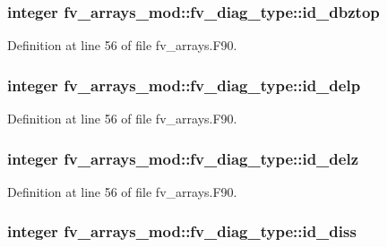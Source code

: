 \subsubsection[{id\-\_\-dbztop}]{\setlength{\rightskip}{0pt plus 5cm}integer fv\-\_\-arrays\-\_\-mod\-::fv\-\_\-diag\-\_\-type\-::id\-\_\-dbztop}\label{structfv__arrays__mod_1_1fv__diag__type_a811e1fc8c66d2fde773fae4b756a5292}


Definition at line 56 of file fv\-\_\-arrays.\-F90.

\subsubsection[{id\-\_\-delp}]{\setlength{\rightskip}{0pt plus 5cm}integer fv\-\_\-arrays\-\_\-mod\-::fv\-\_\-diag\-\_\-type\-::id\-\_\-delp}\label{structfv__arrays__mod_1_1fv__diag__type_a224242f8495b284ff480eab3d9b2bed7}


Definition at line 56 of file fv\-\_\-arrays.\-F90.

\subsubsection[{id\-\_\-delz}]{\setlength{\rightskip}{0pt plus 5cm}integer fv\-\_\-arrays\-\_\-mod\-::fv\-\_\-diag\-\_\-type\-::id\-\_\-delz}\label{structfv__arrays__mod_1_1fv__diag__type_a908e471cd6497efe99427ed197573511}


Definition at line 56 of file fv\-\_\-arrays.\-F90.

\subsubsection[{id\-\_\-diss}]{\setlength{\rightskip}{0pt plus 5cm}integer fv\-\_\-arrays\-\_\-mod\-::fv\-\_\-diag\-\_\-type\-::id\-\_\-diss}\label{structfv__arrays__mod_1_1fv__diag__type_ace291c14a03598d76fd31a89162da256}


